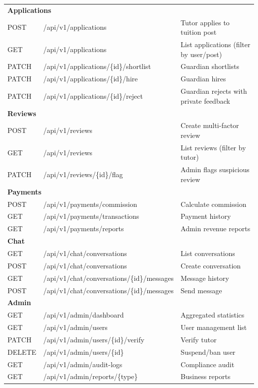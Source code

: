 \documentclass[12pt,a4paper,twoside]{report}
\begin{document}
\begin{longtable}{p{1.5cm}|p{6cm}|p{6cm}}
\multicolumn{3}{l}{\textbf{Applications}} \\
POST & /api/v1/applications & Tutor applies to tuition post \\
GET  & /api/v1/applications & List applications (filter by user/post) \\
PATCH & /api/v1/applications/\{id\}/shortlist & Guardian shortlists \\
PATCH & /api/v1/applications/\{id\}/hire & Guardian hires \\
PATCH & /api/v1/applications/\{id\}/reject & Guardian rejects with private feedback \\

\multicolumn{3}{l}{\textbf{Reviews}} \\
POST & /api/v1/reviews & Create multi-factor review \\
GET  & /api/v1/reviews & List reviews (filter by tutor) \\
PATCH & /api/v1/reviews/\{id\}/flag & Admin flags suspicious review \\

\multicolumn{3}{l}{\textbf{Payments}} \\
POST & /api/v1/payments/commission & Calculate commission \\
GET  & /api/v1/payments/transactions & Payment history \\
GET  & /api/v1/payments/reports & Admin revenue reports \\

\multicolumn{3}{l}{\textbf{Chat}} \\
GET  & /api/v1/chat/conversations & List conversations \\
POST & /api/v1/chat/conversations & Create conversation \\
GET  & /api/v1/chat/conversations/\{id\}/messages & Message history \\
POST & /api/v1/chat/conversations/\{id\}/messages & Send message \\
\multicolumn{3}{l}{\textbf{Admin}} \\
GET  & /api/v1/admin/dashboard & Aggregated statistics \\
GET  & /api/v1/admin/users & User management list \\
PATCH & /api/v1/admin/users/\{id\}/verify & Verify tutor \\
DELETE & /api/v1/admin/users/\{id\} & Suspend/ban user \\
GET  & /api/v1/admin/audit-logs & Compliance audit \\
GET  & /api/v1/admin/reports/\{type\} & Business reports \\
\bottomrule
\end{longtable}
\end{document}
